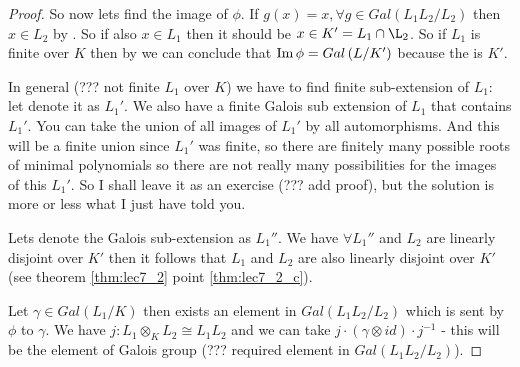 \begin{theorem}
\begin{proof}
    So now lets find the image of $\phi$. If $g\left(x\right) = x,
    \forall g \in Gal\left(L_1 L_2/ L_2\right)$ then $x \in L_2$ by
    . So if also $x \in L_1$ then it
    should be $x \in K' = L_1 \cap \L_2$. So if $L_1$ is finite over
    $K$ then by    we can conclude
    that $\operatorname{Im} \phi = Gal\left(L/K'\right)$ because the
     is $K'$.

    In general (??? not finite $L_1$ over $K$) we have to find finite
    sub-extension of $L_1$: let denote it as $L_1'$. We also have a
    finite Galois sub extension of $L_1$ that contains $L_1'$.
    You can take the union of all images of $L_1'$ by all
    automorphisms. And this will be a finite union since $L_1'$ was
    finite, so there are finitely many possible roots of minimal
    polynomials so there are not really many possibilities for the
    images of this $L_1'$. So I shall leave it as an exercise (??? add
    proof), but the
    solution is more or less what I just have told you.

    Lets denote the Galois sub-extension as $L_1''$. We have
    $\forall L_1''$ and $L_2$ are linearly disjoint over $K'$ then it follows
    that $L_1$ and $L_2$ are also linearly disjoint over $K'$
    (see theorem \ref{thm:lec7_2} point \ref{thm:lec7_2_c}).

    Let $\gamma \in Gal\left(L_1/K\right)$ then exists an element in
    $Gal\left(L_1 L_2/L_2\right)$ which is sent by $\phi$ to $\gamma$.
    We have $j: L_1 \otimes_K L_2 \cong L_1 L_2$ and we can take
    $j \cdot \left(\gamma \otimes id\right) \cdot j^{-1}$ - this will
    be the element of Galois group (??? required element in
    $Gal\left(L_1 L_2/L_2\right)$). 
  \end{proof}
  \label{thm:lec7_3}
\end{theorem}


